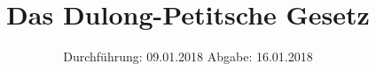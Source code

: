 
\usepackage{wrapfig}
\subject{VERSUCH 201}
\title{Das Dulong-Petitsche Gesetz}
\date{%
  \hspace{-2.5em}
  Durchführung: 09.01.2018
  \hspace{4em}
  Abgabe: 16.01.2018
}


  \setlength{\parindent}{0em}
  \maketitle
  \thispagestyle{empty}
  \newpage
  \tableofcontents
  \newpage





\printbibliography{}



